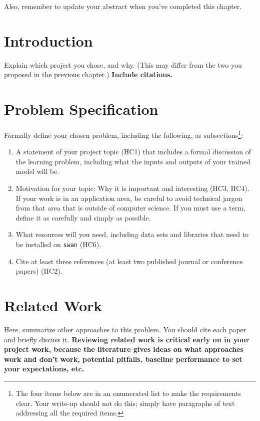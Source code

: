 \documentclass{report}
\begin{document}
Also, remember to update your abstract when you've completed this chapter. 

\section{Introduction}

Explain which project you chose, and why. (This may differ from the two you proposed in the previous chapter.) {\bf Include citations.}

\section{Problem Specification}

Formally define your chosen problem, including the following, as subsections\footnote{The four items below are in an enumerated list to make the requirements clear.  Your write-up should not do this; simply have paragraphs of text addressing all the required items.}:
\begin{enumerate}
    \item A  statement of your project topic (HC1) that includes a formal discussion of the learning problem, including what the inputs and outputs of your trained model will be.
    \item Motivation for your topic: Why it is important and interesting (HC3, HC4). If your work is in an application area, be careful to avoid technical jargon from that area that is outside of computer science. If you must use a term, define it as carefully and simply as possible.
   \item What resources will you need, including data sets and libraries that need to be installed on {\tt swan} (HC6).
   \item Cite at least three references (at least two published journal or conference papers) (HC2).
\end{enumerate}

\section{Related Work}

Here, summarize other approaches to this problem.  You should cite each paper and briefly discuss it. {\bf Reviewing related work is critical early on in your project work, because the literature gives ideas on what approaches work and don't work, potential pitfalls, baseline performance to set your expectations, etc.}
\end{document}
